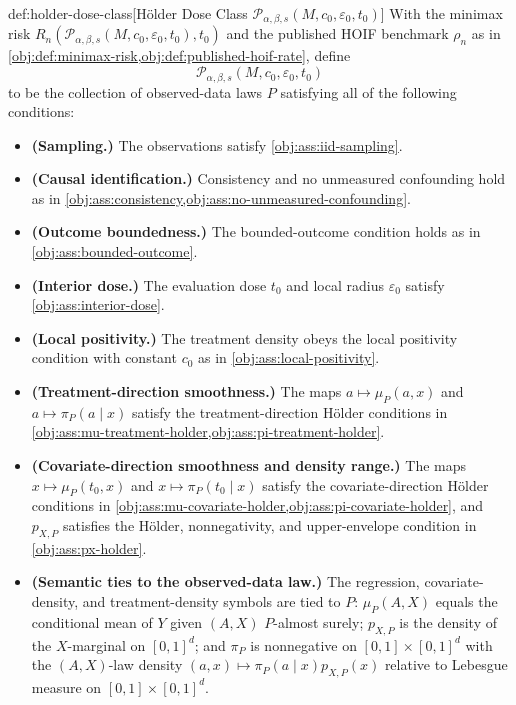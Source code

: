 \documentclass[11pt]{article}
\begin{document}
\begin{definitionv}{def:holder-dose-class}[Hölder Dose Class \(\mathcal P_{\alpha,\beta,s}(M,c_0,\varepsilon_0,t_0)\)]
With the minimax risk \(R_n(\mathcal P_{\alpha,\beta,s}(M,c_0,\varepsilon_0,t_0),t_0)\) and the published HOIF benchmark \(\rho_n\) as in \cref{obj:def:minimax-risk,obj:def:published-hoif-rate}, define
\[
\mathcal P_{\alpha,\beta,s}(M,c_0,\varepsilon_0,t_0)
\]
to be the collection of observed-data laws \(P\) satisfying all of the following conditions:
\begin{itemize}
\item \textbf{(Sampling.)} The observations satisfy \cref{obj:ass:iid-sampling}.
\item \textbf{(Causal identification.)} Consistency and no unmeasured confounding hold as in \cref{obj:ass:consistency,obj:ass:no-unmeasured-confounding}.
\item \textbf{(Outcome boundedness.)} The bounded-outcome condition holds as in \cref{obj:ass:bounded-outcome}.
\item \textbf{(Interior dose.)} The evaluation dose \(t_0\) and local radius \(\varepsilon_0\) satisfy \cref{obj:ass:interior-dose}.
\item \textbf{(Local positivity.)} The treatment density obeys the local positivity condition with constant \(c_0\) as in \cref{obj:ass:local-positivity}.
\item \textbf{(Treatment-direction smoothness.)} The maps \(a\mapsto \mu_P(a,x)\) and \(a\mapsto \pi_P(a\mid x)\) satisfy the treatment-direction Hölder conditions in \cref{obj:ass:mu-treatment-holder,obj:ass:pi-treatment-holder}.
\item \textbf{(Covariate-direction smoothness and density range.)} The maps \(x\mapsto\mu_P(t_0,x)\) and \(x\mapsto\pi_P(t_0\mid x)\) satisfy the covariate-direction Hölder conditions in \cref{obj:ass:mu-covariate-holder,obj:ass:pi-covariate-holder}, and \(p_{X,P}\) satisfies the Hölder, nonnegativity, and upper-envelope condition in \cref{obj:ass:px-holder}.
\item \textbf{(Semantic ties to the observed-data law.)} The regression, covariate-density, and treatment-density symbols are tied to \(P\): \(\mu_P(A,X)\) equals the conditional mean of \(Y\) given \((A,X)\) \(P\)-almost surely; \(p_{X,P}\) is the density of the \(X\)-marginal on \([0,1]^d\); and \(\pi_P\) is nonnegative on \([0,1]\times[0,1]^d\) with the \((A,X)\)-law density \((a,x)\mapsto \pi_P(a\mid x)p_{X,P}(x)\) relative to Lebesgue measure on \([0,1]\times[0,1]^d\).
\end{itemize}
\end{definitionv}
\end{document}

